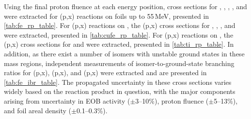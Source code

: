 



Using the final proton fluence at each energy position, cross sections for , ,  ,   , and 
 were extracted for (p,x) reactions  on  foils up to 55\,MeV, presented in \autoref{tab:fe_rp_table}.
For  (p,x) reactions on , the (p,x) cross sections for  , , ,   and   were extracted, 
presented in \autoref{tab:cufe_rp_table}.
For  (p,x) reactions on , the (p,x) cross sections for   and   were extracted, 
presented in \autoref{tab:ti_rp_table}.
In addition, as there exist a number of isomers with 
unstable ground states in these mass regions,  independent measurements of isomer-to-ground-state branching ratios for (p,x), (p,x), and (p,x) were  extracted and are presented in \autoref{tab:fe_ibr_table}.
The propagated uncertainty in these cross sections varies widely based on the reaction product in question, with the major components  arising from uncertainty in EOB activity ($\pm$3--10\%), proton fluence ($\pm$5--13\%), and foil areal density ($\pm$0.1--0.3\%).















